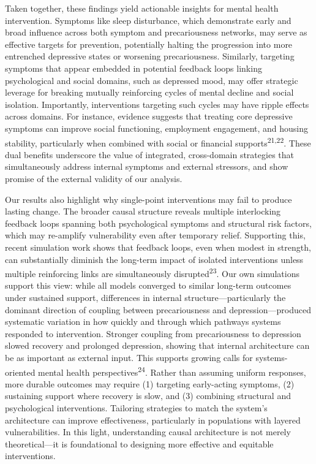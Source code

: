 \documentclass[
]{article}
\begin{document}
Taken together, these findings yield actionable insights for mental
health intervention. Symptoms like sleep disturbance, which demonstrate
early and broad influence across both symptom and precariousness
networks, may serve as effective targets for prevention, potentially
halting the progression into more entrenched depressive states or
worsening precariousness. Similarly, targeting symptoms that appear
embedded in potential feedback loops linking psychological and social
domains, such as depressed mood, may offer strategic leverage for
breaking mutually reinforcing cycles of mental decline and social
isolation. Importantly, interventions targeting such cycles may have
ripple effects across domains. For instance, evidence suggests that
treating core depressive symptoms can improve social functioning,
employment engagement, and housing stability, particularly when combined
with social or financial supports\textsuperscript{21,22}. These dual
benefits underscore the value of integrated, cross-domain strategies
that simultaneously address internal symptoms and external stressors,
and show promise of the external validity of our analysis.

Our results also highlight why single-point interventions may fail to
produce lasting change. The broader causal structure reveals multiple
interlocking feedback loops spanning both psychological symptoms and
structural risk factors, which may re-amplify vulnerability even after
temporary relief. Supporting this, recent simulation work shows that
feedback loops, even when modest in strength, can substantially diminish
the long-term impact of isolated interventions unless multiple
reinforcing links are simultaneously disrupted\textsuperscript{23}. Our
own simulations support this view: while all models converged to similar
long-term outcomes under sustained support, differences in internal
structure---particularly the dominant direction of coupling between
precariousness and depression---produced systematic variation in how
quickly and through which pathways systems responded to intervention.
Stronger coupling from precariousness to depression slowed recovery and
prolonged depression, showing that internal architecture can be as
important as external input. This supports growing calls for
systems-oriented mental health perspectives\textsuperscript{24}. Rather
than assuming uniform responses, more durable outcomes may require (1)
targeting early-acting symptoms, (2) sustaining support where recovery
is slow, and (3) combining structural and psychological interventions.
Tailoring strategies to match the system's architecture can improve
effectiveness, particularly in populations with layered vulnerabilities.
In this light, understanding causal architecture is not merely
theoretical---it is foundational to designing more effective and
equitable interventions.
\end{document}
